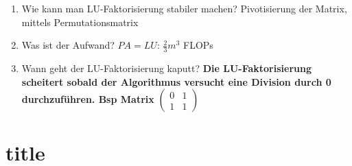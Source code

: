 \documentclass[10pt,a4paper,titlepage]{article}
\newcommand{\luf}{LU-Faktorisierung\xspace}
\begin{document}
\begin{enumerate}[series=b]
	\item Wie kann man \luf stabiler machen?\newline
	Pivotisierung der Matrix, mittels Permutationsmatrix
	\item Was ist der Aufwand? \newline
	$PA=LU$: $\frac{2}{3}m^3$ FLOPs
	\item Wann geht der \luf kaputt?
	\textbf{Die \luf scheitert sobald der Algorithmus versucht eine Division durch 0 durchzuführen. Bsp Matrix} $\begin{pmatrix}
	0&1\\
	1&1
	\end{pmatrix}$
	
\end{enumerate}
\section{title}
\end{document}
